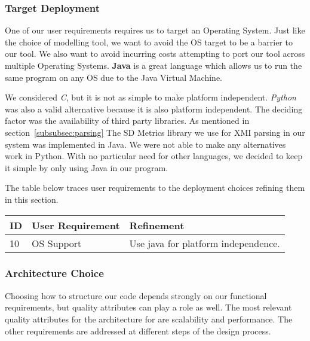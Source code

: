 \documentclass[11pt]{article}
\begin{document}
    \newpage
    \subsubsection{Target Deployment}
    One of our user requirements requires us to target an Operating System.
    Just like the choice of modelling tool, we want to avoid the OS target to be a barrier to our tool.
    We also want to avoid incurring costs attempting to port our tool across multiple Operating Systems.
    \textbf{Java} is a great language which allows us to run the same program on any OS due to the Java Virtual Machine.

    We considered \textit{C}, but it is not as simple to make platform independent.
    \textit{Python} was also a valid alternative because it is also platform independent.
    The deciding factor was the availability of third party libraries.
    As mentioned in section~\ref{subsubsec:parsing} The SD Metrics library we use for XMI parsing in our system was implemented in Java.
    We were not able to make any alternatives work in Python.
    With no particular need for other languages, we decided to keep it simple by only using Java in our program.

    The table below traces user requirements to the deployment choices refining them in this section.
    \begin{table}[htbp]
        \centering
        \begin{tabularx}{\textwidth}{| l | l | X |}
            \hline
            \textbf{ID} & \textbf{User Requirement} & \textbf{Refinement} \\
            \hline
            10 & OS Support & Use java for platform independence. \\ \hline
        \end{tabularx}\label{tab:os-choice-table}
    \end{table}

    \newpage
    \subsubsection{Architecture Choice}
    Choosing how to structure our code depends strongly on our functional requirements,
    but quality attributes can play a role as well.
    The most relevant quality attributes for the architecture for are scalability and performance.
    The other requirements are addressed at different steps of the design process.
\end{document}
